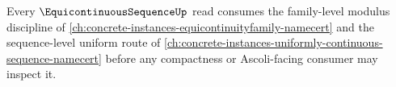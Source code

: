 Every $\EquicontinuousSequenceUp$ read consumes the family-level modulus discipline of \autoref{ch:concrete-instances-equicontinuityfamily-namecert} and the sequence-level uniform route of \autoref{ch:concrete-instances-uniformly-continuous-sequence-namecert} before any compactness or Ascoli-facing consumer may inspect it.
